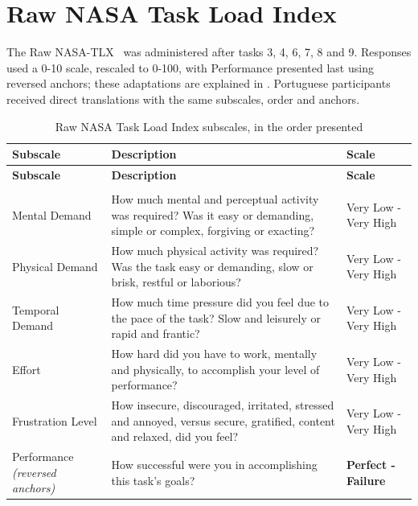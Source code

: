 \section{Raw NASA Task Load Index}
\label{sec:appB_tlx}

The Raw \ac{NASA-TLX}~\cite{Hart:1988TLX,Hart:2006TLX} was administered after tasks 3, 4, 6, 7, 8 and 9. Responses used a 0-10 scale, rescaled to 0-100, with Performance presented last using reversed anchors; these adaptations are explained in . Portuguese participants received direct translations with the same subscales, order and anchors.

{\footnotesize
\renewcommand{\arraystretch}{1.15}
\setlength{\tabcolsep}{5pt}

\begin{longtable}{
    >{\raggedright\arraybackslash}p{3.5cm}
    >{\raggedright\arraybackslash}p{8.4cm}
    >{\raggedright\arraybackslash}p{3cm}}

\caption{Raw NASA Task Load Index subscales, in the order presented}
\label{tab:appB_tlx} \\

\toprule
\textbf{Subscale} & \textbf{Description} & \textbf{Scale} \\
\midrule
\endfirsthead

\toprule
\textbf{Subscale} & \textbf{Description} & \textbf{Scale} \\
\midrule
\endhead

\midrule
\multicolumn{3}{r}{\textit{Continued on next page}} \\
\bottomrule
\endfoot

\bottomrule
\endlastfoot

Mental Demand &
How much mental and perceptual activity was required? Was it easy or demanding, simple or complex, forgiving or exacting? &
Very Low - Very High \\

Physical Demand &
How much physical activity was required? Was the task easy or demanding, slow or brisk, restful or laborious? &
Very Low - Very High \\

Temporal Demand &
How much time pressure did you feel due to the pace of the task? Slow and leisurely or rapid and frantic? &
Very Low - Very High \\

Effort &
How hard did you have to work, mentally and physically, to accomplish your level of performance? &
Very Low - Very High \\

Frustration Level &
How insecure, discouraged, irritated, stressed and annoyed, versus secure, gratified, content and relaxed, did you feel? &
Very Low - Very High \\

Performance \emph{(reversed anchors)} &
How successful were you in accomplishing this task's goals? &
\textbf{Perfect - Failure} \\

\end{longtable}
}


